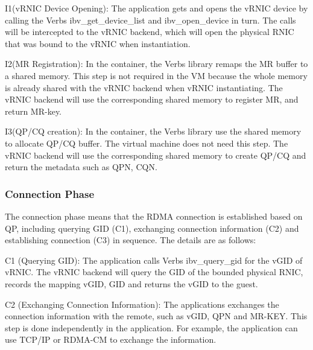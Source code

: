 I1(vRNIC Device Opening): The application gets and opens the vRNIC device by calling the Verbs ibv\_get\_device\_list and ibv\_open\_device in turn. The calls will be intercepted to the vRNIC backend, which will open the physical RNIC that was bound to the vRNIC when instantiation.

I2(MR Registration): In the container, the Verbs library remaps the MR buffer to a shared memory. This step is not required in the VM because the whole memory is already shared with the vRNIC backend when vRNIC instantiating. The vRNIC backend will use the corresponding shared memory to register MR, and return MR-key. 

I3(QP/CQ creation): In the container, the Verbs library use the shared memory to allocate QP/CQ buffer. The virtual machine does not need this step. The vRNIC backend will use the corresponding shared memory to create QP/CQ and return the metadata such as QPN, CQN.

\subsubsection{Connection Phase}
The connection phase means that the RDMA connection is established based on QP, including querying GID (C1), exchanging connection information (C2) and establishing connection (C3) in sequence. The details are as follows:

C1 (Querying GID): The application calls Verbs ibv\_query\_gid for the vGID of vRNIC. The vRNIC backend will query the GID of the bounded physical RNIC, records the mapping {vGID, GID} and returns the vGID to the guest.

C2 (Exchanging Connection Information): The applications exchanges the connection information with the remote, such as vGID, QPN and MR-KEY. This step is done independently in the application. For example, the application can use TCP/IP or RDMA-CM to exchange the information.

